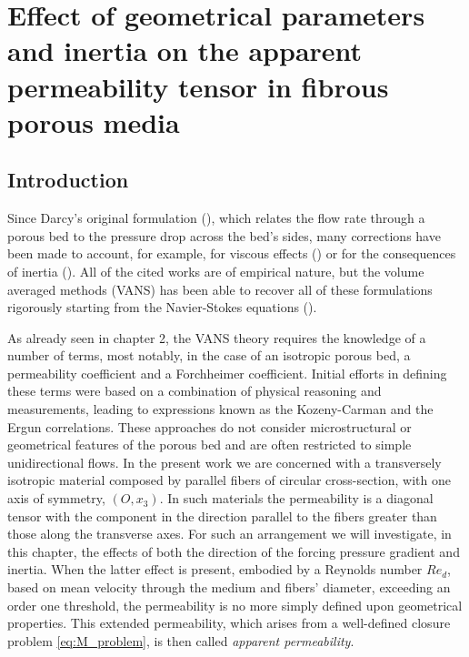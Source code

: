 \chapter{Effect of geometrical parameters and inertia on the apparent permeability tensor in fibrous porous media}
\label{ch:4}




\section{Introduction}

Since Darcy's original formulation (\citet{darcy}), which relates the flow rate through a porous bed to the pressure drop across the bed's sides, many corrections have been made to account, for example, for viscous effects (\citet{brinkman}) or for the consequences of inertia (\citet{forchheimer}).  
All of the cited works are of empirical nature, but the volume averaged methods (VANS) has been able to recover all of these
formulations rigorously starting from the Navier-Stokes equations (\citet{whitaker2013method}).

As already seen in chapter 2, the VANS theory requires the knowledge of a number of terms, most notably, in the case of an isotropic porous bed, a permeability coefficient and a Forchheimer coefficient. Initial efforts in defining these terms were based on a combination of physical reasoning and measurements, leading to  expressions known as the Kozeny-Carman \citet{kozeny, carman} and the Ergun \citet{ergun} correlations. These approaches do not consider microstructural or geometrical features of the porous bed and are often restricted to simple unidirectional flows. In the present work we are concerned with a transversely isotropic material composed by parallel fibers of circular cross-section, with one axis of symmetry, $(O,x_3)$. In such materials the permeability is a diagonal tensor
with the component in the direction parallel to the fibers greater than those along the transverse axes. For such an arrangement
we will investigate, in this chapter, the effects of both the direction of the forcing pressure gradient and inertia. When the latter effect is present,
embodied by a Reynolds number $Re_d$, based on mean velocity through the medium and fibers' diameter, exceeding an order one threshold, 
the permeability is no more simply defined upon geometrical properties. This extended permeability, which arises from a well-defined closure problem \eqref{eq:M_problem}, is then called \emph{apparent permeability}.

